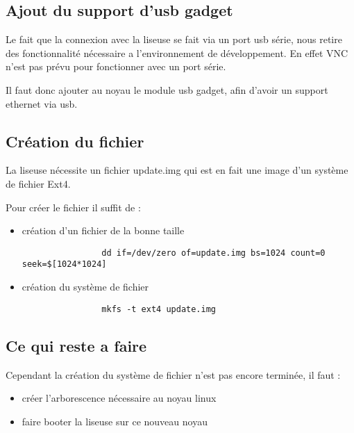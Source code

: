  \subsection{Ajout du support d'usb gadget}
 
 Le fait que la connexion avec la liseuse se fait via un port usb série, nous retire des fonctionnalité nécessaire a l'environnement de développement. En effet VNC n'est pas prévu pour fonctionner avec un port série.
 
 Il faut donc ajouter au noyau le module usb gadget, afin d'avoir un support ethernet via usb.

\subsection{Création du fichier}

La liseuse nécessite un fichier update.img qui est en fait une image d'un système de fichier Ext4.

Pour créer le fichier il suffit de : 
	\begin{itemize}
		\item création d'un fichier de la bonne taille \\
			\begin{verbatim}
				dd if=/dev/zero of=update.img bs=1024 count=0 seek=$[1024*1024]
			\end{verbatim}
		\item création du système de fichier \\
			\begin{verbatim}
				mkfs -t ext4 update.img
			\end{verbatim}
	\end{itemize}

\subsection{Ce qui reste a faire}

Cependant la création du système de fichier n'est pas encore terminée, il faut :
	\begin{itemize}
		\item créer l'arborescence nécessaire au noyau linux
		\item faire booter la liseuse sur ce nouveau noyau
	\end{itemize}